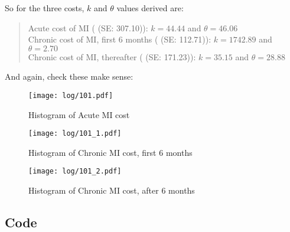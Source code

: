 \documentclass[11pt]{article}
\begin{document}
So for the three costs, \begin{math} k \end{math} and \begin{math} \theta \end{math} values derived are:

\begin{quote}
Acute cost of MI ( (SE: 307.10)): 
\begin{math} 
k = 44.44 
\end{math}
and 
\begin{math} 
\theta = 46.06
\end{math} 
\\
Chronic cost of MI, first 6 months ( (SE: 112.71)): 
\begin{math} 
k = 1742.89
\end{math}
and 
\begin{math} 
\theta = 2.70
\end{math} 
\\
Chronic cost of MI, thereafter ( (SE: 171.23)): 
\begin{math} 
k = 35.15 
\end{math}
and 
\begin{math} 
\theta = 28.88
\end{math} 


\end{quote}

And again, check these make sense:

\color{Blue4}
\begin{figure}
    \centering
    \texttt{[image: log/101.pdf]}
    \caption{Histogram of Acute MI cost}
    \label{PSAhist6}
\end{figure}
\begin{figure}
    \centering
    \texttt{[image: log/101\_1.pdf]}
    \caption{Histogram of Chronic MI cost, first 6 months}
    \label{PSAhist7}
\end{figure}
\begin{figure}
    \centering
    \texttt{[image: log/101\_2.pdf]}
    \caption{Histogram of Chronic MI cost, after 6 months}
    \label{PSAhist8}
\end{figure}
\begin{stlog}\end{stlog}
\color{black}

\subsection{Code}
\end{document}
